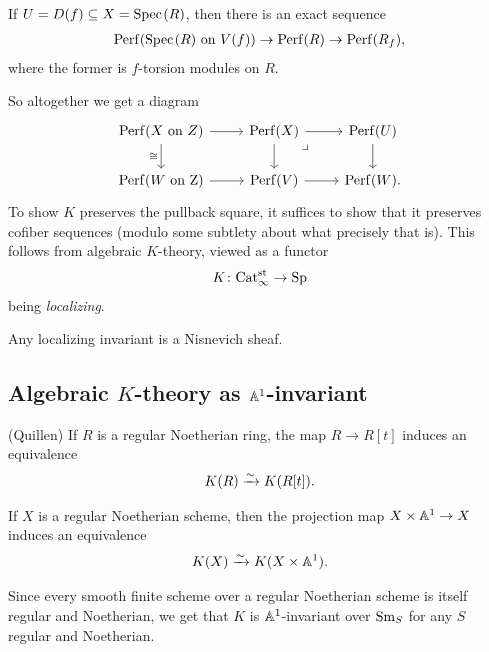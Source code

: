\documentclass[11pt,openany]{book}
\begin{document}
\begin{example} If $U = D(f) \subseteq X = \text{Spec}\hspace{0.1em}(R)$, then there is an exact sequence
\begin{align*}
    \mathrm{Perf}(\text{Spec}\hspace{0.1em}(R) \text{ on } V(f)) \to \mathrm{Perf}(R) \to \mathrm{Perf}(R_f),
\end{align*}
where the former is $f$-torsion modules on $R$.
\end{example}

So altogether we get a diagram
\[ \begin{tikzcd}
    \Perf(X\text{ on }Z)\rar\dar["\cong" left] & \Perf(X)\rar\dar\pb & \Perf(U)\dar\\
    \Perf(W\text{ on Z})\rar & \Perf(V)\rar & \Perf(W).
\end{tikzcd} \]
To show $K$ preserves the pullback square, it suffices to show that it preserves cofiber sequences (modulo some subtlety about what precisely that is). This follows from algebraic $K$-theory, viewed as a functor
\begin{align*}
    K \colon \mathrm{Cat}_\infty^{\mathrm{st}} \to \mathrm{Sp}
\end{align*}
being \textit{localizing}.

\begin{corollary} Any localizing invariant is a Nisnevich sheaf.
\end{corollary}

\subsection{Algebraic $K$-theory as $\mathbb{A}^1$-invariant}

\begin{theorem} \cite[p.~38]{Quillen} (Quillen) If $R$ is a regular Noetherian ring, the map $R \to R[t]$ induces an equivalence
\begin{align*}
    K(R) \xrightarrow{\sim} K(R[t]).
\end{align*}
\end{theorem}

\begin{theorem} \cite[6.8]{TT} If $X$ is a regular Noetherian scheme, then the projection map $X \times \mathbb{A}^1 \to X$ induces an equivalence
\begin{align*}
    K(X) \xrightarrow{\sim} K(X \times \mathbb{A}^1).
\end{align*}
\end{theorem}

Since every smooth finite scheme over a regular Noetherian scheme is itself regular and Noetherian, we get that $K$ is $\mathbb{A}^1$-invariant over $\mathrm{Sm}_S$ for any $S$ regular and Noetherian.
\end{document}
